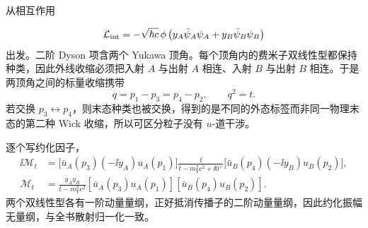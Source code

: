 





\begin{derivation}
从相互作用

\begin{equation*}
\mathcal L_{\rm int}
=-\sqrt{\hbar c}\,\phi
\left(y_A\bar\psi_A\psi_A+y_B\bar\psi_B\psi_B\right)
\end{equation*}
出发。二阶 Dyson 项含两个 Yukawa 顶角。每个顶角内的费米子双线性型都保持种类，因此外线收缩必须把入射 $A$ 与出射 $A$ 相连、入射 $B$ 与出射 $B$ 相连。于是两顶角之间的标量收缩携带
\begin{equation*}
q=p_1-p_3=p_4-p_2,
\qquad q^2=t.
\end{equation*}
若交换 $p_3\leftrightarrow p_4$，则末态种类也被交换，得到的是不同的外态标签而非同一物理末态的第二种 Wick 收缩，所以可区分粒子没有 $u$-道干涉。

逐个写约化因子，
\begin{align*}
\ii\mathcal M_t
&=\bigl[\bar u_A(p_3)(-\ii y_A)u_A(p_1)\bigr]
\frac{\ii}{t-m_Y^2c^2+\ii0^+}
\bigl[\bar u_B(p_4)(-\ii y_B)u_B(p_2)\bigr],\\
\mathcal M_t
&=\frac{y_Ay_B}{t-m_Y^2c^2}
[\bar u_A(p_3)u_A(p_1)]
[\bar u_B(p_4)u_B(p_2)].
\end{align*}
两个双线性型各有一阶动量量纲，正好抵消传播子的二阶动量量纲，因此约化振幅无量纲，与全书散射归一化一致。
\end{derivation}

